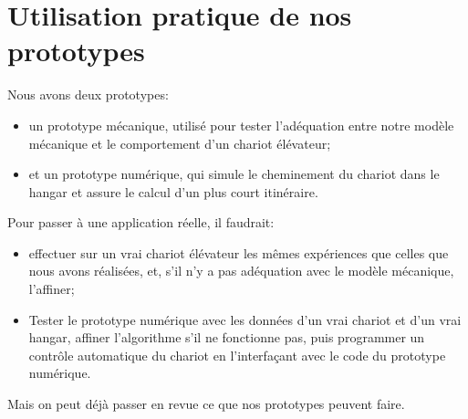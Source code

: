 \section{Utilisation pratique de nos prototypes}
\label{proto}
Nous avons deux prototypes:
\begin{itemize}
	\item un prototype mécanique, utilisé pour tester l'adéquation entre notre modèle mécanique et le comportement d'un chariot élévateur;
	\item et un prototype numérique, qui simule le cheminement du chariot dans le hangar et assure le calcul d'un plus court itinéraire.
\end{itemize}
Pour passer à une application réelle, il faudrait:
\begin{itemize}
	\item effectuer sur un vrai chariot élévateur les mêmes expériences que celles que nous avons réalisées, et, s'il n'y a pas adéquation avec le modèle mécanique, l'affiner;
	\item Tester le prototype numérique avec les données d'un vrai chariot et d'un vrai hangar, affiner l'algorithme s'il ne fonctionne pas, puis programmer un contrôle automatique du chariot en l'interfaçant avec le code du prototype numérique.\end{itemize}
Mais on peut déjà passer en revue ce que nos prototypes peuvent faire.
